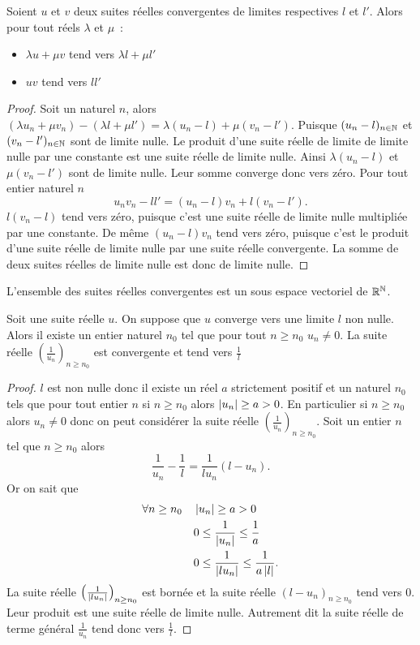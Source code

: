 \begin{prop}
  Soient $u$ et $v$ deux suites réelles convergentes de limites respectives $l$ et $l'$. Alors pour tout réels $\lambda$ et $\mu$~:
  \begin{itemize}
  \item $\lambda u + \mu v$ tend vers $\lambda l + \mu l'$
  \item $uv$ tend vers $ll'$
  \end{itemize}
\end{prop}
\begin{proof}
  Soit un naturel $n$, alors $(\lambda u_n + \mu v_n) - (\lambda l +\mu l')=\lambda(u_n-l)+\mu(v_n-l')$. Puisque $(u_n-l)_{n\in\mathbb{N}}$ et $(v_n-l')_{n\in\mathbb{N}}$ sont de limite nulle. Le produit d'une suite réelle de limite de limite nulle par une constante est une suite réelle de limite nulle. Ainsi $\lambda(u_n-l)$ et $\mu(v_n-l')$ sont de limite nulle. Leur somme converge donc vers zéro. Pour tout entier naturel $n$
\begin{equation}
  u_nv_n-ll'=(u_n-l)v_n+l(v_n-l').
\end{equation}
$l(v_n-l)$ tend vers zéro, puisque c'est une suite réelle de limite nulle multipliée par une constante. De même $(u_n-l)v_n$ tend vers zéro, puisque c'est le produit d'une suite réelle de limite nulle par une suite réelle convergente. La somme de deux suites réelles de limite nulle est donc de limite nulle.
\end{proof}
L'ensemble des suites réelles convergentes est un sous espace vectoriel de $\mathbb{R}^{\mathbb{N}}$.
\begin{prop}
  Soit une suite réelle $u$. On suppose que $u$ converge vers une limite $l$ non nulle. Alors il existe un entier naturel $n_0$ tel que pour tout $n \geq n_0$ $u_n \neq 0$. La suite réelle $\left(\frac{1}{u_n}\right)_{n \geq n_0}$ est convergente et tend vers $\frac{1}{l}$
\end{prop}
\begin{proof}
  $l$ est non nulle donc il existe un réel $a$ strictement positif et un naturel $n_0$ tels que pour tout entier $n$ si $n \geq n_0$ alors $\left\lvert u_n\right\rvert \geq a >0$. En particulier si $n \geq n_0$ alors $u_n \neq 0$ donc on peut considérer la suite réelle $\left(\frac{1}{u_n}\right)_{n \geq n_0}$. Soit un entier $n$ tel que $n \geq n_0$ alors
  \begin{equation}
    \frac{1}{u_n}-\frac{1}{l}=\frac{1}{lu_n}(l-u_n).
  \end{equation}
  Or on sait que
  \begin{align}
    \forall n \geq n_0 \quad &\left\lvert u_n\right\rvert \geq a > 0 \\
    & 0 \leq \frac{1}{\left\lvert u_n\right\rvert} \leq \frac{1}{a} \\
    & 0 \leq \frac{1}{\left\lvert lu_n\right\rvert} \leq \frac{1}{a\left\lvert l\right\rvert}.
  \end{align}
  La suite réelle $\left(\frac{1}{\left\lvert lu_n\right\rvert}\right)_{n \geq n_0}$ est bornée et la suite réelle $(l-u_n)_{n \geq n_0}$ tend vers 0. Leur produit est une suite réelle de limite nulle. Autrement dit la suite réelle de terme général $\frac{1}{u_n}$ tend donc vers $\frac{1}{l}$.
\end{proof}

